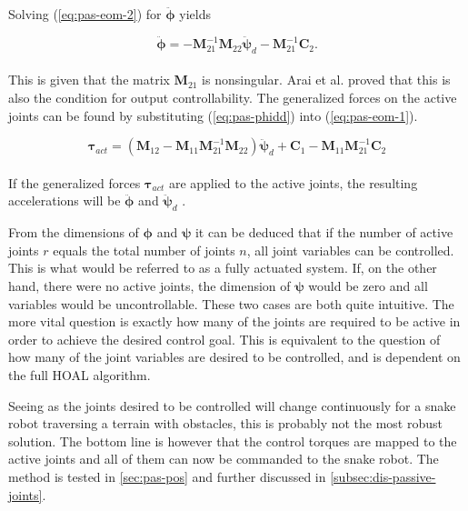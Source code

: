 Solving (\ref{eq:pas-eom-2}) for $\ddot{\boldsymbol{\phi}}$ yields

\begin{equation}\label{eq:pas-phidd}
    \ddot{\boldsymbol{\phi}} = - \mathbf{M}^{-1}_{21}  \mathbf{M}_{22} \ddot{\boldsymbol{\psi}}_d - \mathbf{M}^{-1}_{21} \mathbf{C}_2.
\end{equation}
\\
This is given that the matrix $\mathbf{M}_{21}$ is nonsingular. Arai et al. \cite{arai1991position} proved that this is also the condition for output controllability.
The generalized forces on the active joints can be found by substituting (\ref{eq:pas-phidd}) into (\ref{eq:pas-eom-1}).

\begin{equation}\label{eq:tau-act}
    \boldsymbol{\tau}_{act} = (\mathbf{M}_{12} - \mathbf{M}_{11} \mathbf{M}^{-1}_{21} \mathbf{M}_{22})\ddot{\boldsymbol{\psi}}_d + \mathbf{C}_1 - \mathbf{M}_{11} \mathbf{M}^{-1}_{21} \mathbf{C}_2
\end{equation}
\\
If the generalized forces $\boldsymbol{\tau}_{act}$ are applied to the active joints, the resulting accelerations will be $\ddot{\boldsymbol{\phi}}$ and $\ddot{\boldsymbol{\psi}}_d$ \cite{arai1991position}.

From the dimensions of $\boldsymbol{\phi}$ and $\boldsymbol{\psi}$ it can be deduced that if the number of active joints $r$ equals the total number of joints $n$, all joint variables can be controlled. This is what would be referred to as a fully actuated system. If, on the other hand, there were no active joints, the dimension of $\boldsymbol{\psi}$ would be zero and all variables would be uncontrollable. These two cases are both quite intuitive. The more vital question is exactly how many of the joints are required to be active in order to achieve the desired control goal. This is equivalent to the question of how many of the joint variables are desired to be controlled, and is dependent on the full HOAL algorithm.

Seeing as the joints desired to be controlled will change continuously for a snake robot traversing a terrain with obstacles, this is probably not the most robust solution. The bottom line is however that the control torques are mapped to the active joints and all of them can now be commanded to the snake robot. The method is tested in \ref{sec:pas-pos} and further discussed in \ref{subsec:dis-passive-joints}.